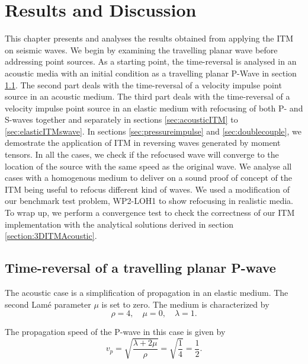 \chapter{Results and Discussion}\label{chapter:Results}
This chapter presents and analyses the results obtained from applying the \ac{ITM} on seismic waves.
We begin by examining the travelling planar wave before addressing point sources. 
As a starting point, the time-reversal is analysed in an acoustic media with an initial condition
as a travelling planar P-Wave in section \ref{sec:acoustictravelling}. The second part deals with the time-reversal of a velocity impulse point source in an acoustic medium. The third part deals with the time-reversal
of a velocity impulse point source in an elastic medium with refocusing of both P- and S-waves together and separately in sections \ref{sec:acousticITM} to \ref{sec:elasticITMswave}. 
In sections \ref{sec:pressureimpulse} and \ref{sec:doublecouple}, we demostrate the application of \ac{ITM} in reversing waves generated by moment tensors. In all the cases, we check if the refocused wave will converge to the location of the source with the same speed as the original wave. We analyse all cases with a homogenous medium to deliver on a sound proof of concept of the \ac{ITM} being useful to refocus different kind of waves. We used a modification
of our benchmark test problem, WP2-LOH1 to show refocusing in realistic media.\\
To wrap up, we perform a convergence test to check the correctness of our \ac{ITM} implementation with the analytical solutions derived in section \ref{section:3DITMAcoustic}.

\section{Time-reversal of a travelling planar P-wave} \label{sec:acoustictravelling}
The acoustic case is a simplification of propagation in an elastic medium. The second Lam\'{e} parameter $\mu$ is set to zero. The medium is characterized by
\begin{equation}
    \rho = 4, \quad \mu = 0, \quad \lambda = 1 .
\end{equation}

The propagation speed of the P-wave in this case is given by
\begin{equation}
    v_p = \sqrt{\frac{\lambda + 2 \mu}{\rho}} = \sqrt{\frac{1}{4}} = \frac{1}{2} .
\end{equation}

